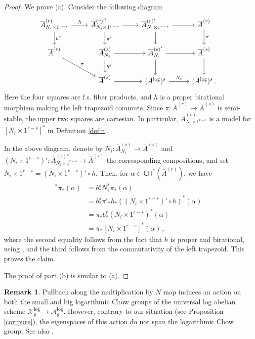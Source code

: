 \documentclass[11pt]{article}
\def\CH{\mathsf{CH}}
\def\A{\mathcal{A}}
\def\X{\mathcal{X}}
\renewcommand{\log}{\mathrm{log}}
\newcommand{\barA}{\overline{A}}
\newcommand{\logA}{{A^{\log}}}
\theoremstyle{definition}
\newtheorem{remark}[definition]{Remark}
\begin{document}
\begin{proof}
    We prove (a). Consider the following diagram
    \[
    \begin{tikzcd}
        \barA^{(r)}_{N_i \times 1^{r-s}} \ar[r,"h"] \ar[d,"b^r"] & \barA^{(r)''}_{N_i \times 1^{r-s}} \ar[d,"\pi'"] \ar[r]  &\barA^{(r)'}_{N_i \times 1^{r-s}} \ar[r] \ar[d] & \barA^{(r)} \ar[d,"\pi"] \\
        \barA^{(r)} \ar[dr,"\pi"] &\barA^{(s)}_{N_i} \ar[r] \ar[d,"b^s"] & \barA^{(s)'}_{N_i} \ar[r] \ar[d] & \barA^{(s)} \ar[d] \\
        &\barA^{(s)} \ar[r] & (\logA)^s \ar[r,"N_i"] & (\logA)^s\,.
    \end{tikzcd}
    \]
    Here the four squares are f.s. fiber products, and $h$ is a proper birational morphism making the left trapezoid commute. Since $\pi : \barA^{(r)} \to \barA^{(s)}$ is semi-stable, the upper two squares are cartesian. In particular, $\barA^{(r)}_{N_i\times 1^{r-s}}$ is a model for $[N_i \times 1^{r-s}]^*$ in Definition \ref{def:n}.

    In the above diagram, denote by $N_i :\barA_{N_i}^{(s)} \to \barA^{(s)}$ and $(N_i \times 1^{r-s})' : \barA^{(r)''}_{N_i \times 1^{r-s}} \to \barA^{(r)}$ the corresponding compositions, and set $N_i \times 1^{r-s}= (N_i \times 1^{r-s})' \circ h$. Then, for $\alpha \in \CH^*(\barA^{(r)})$, we have
    \begin{align*}
        [N_i]^*\pi_*(\alpha)
        & = b^s_* N_i^*\pi_*(\alpha) \\
        & = b^s_*\pi'_*h_*((N_i\times 1^{r-s})' \circ h)^*(\alpha)\\
        & = \pi_*b^r_*(N_i \times 1^{r-s})^*(\alpha)\\
        & = \pi_*[N_i\times 1^{r-s}]^*(\alpha)\,,
    \end{align*}
    where the second equality follows from the fact that $h$ is proper and birational, using \cite[Lemma C.8]{BS1}, and the third follows from the commutativity of the left trapezoid. This proves the claim.

    The proof of part (b) is similar to (a).
\end{proof}

\begin{remark}
    Pullback along the multiplication by $N$ map induces an action on both the
    small and big logarithmic Chow groups of the universal log abelian
	scheme $\X_g^{\log} \to \A_g^{\log}$. However, contrary to our situation (see Proposition \ref{cor:pure}),
	the eigenspaces of this action do not span the logarithmic Chow group. See also \cite{BGHdJ}.
\end{remark}
\end{document}
